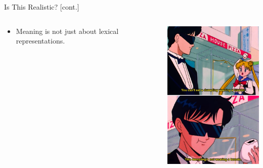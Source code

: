 \documentclass[professionalfonts, xcolor={usenames,svgnames,x11names,table}]{beamer}
\begin{document}
\begin{frame}{Is This Realistic? [cont.]}

\begin{columns}
\begin{column}{0.5\textwidth}
    \begin{itemize}
        \item Meaning is not just about lexical representations.
   \end{itemize}
   
   \vspace{0.5cm}
\end{column}
\begin{column}{0.5\textwidth}
\includegraphics[width=14em]{./img/ambiguity}
\end{column}
\end{columns}
\end{frame}
\end{document}
